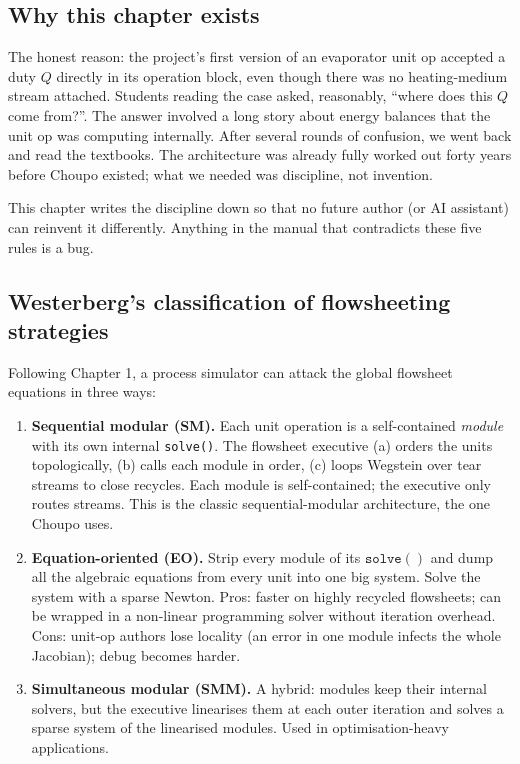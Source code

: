 \documentclass[11pt,a4paper]{article}
\begin{document}
\subsection{Why this chapter exists}

The honest reason: the project's first version of an evaporator unit
op accepted a duty $Q$ directly in its operation block, even though
there was no heating-medium stream attached.  Students reading the
case asked, reasonably, ``where does this $Q$ come from?''.  The
answer involved a long story about energy balances that the unit op
was computing internally.  After several rounds of confusion, we
went back and read the textbooks.  The architecture was already
fully worked out forty years before Choupo existed; what we needed
was discipline, not invention.

This chapter writes the discipline down so that no future author
(or AI assistant) can reinvent it differently.  Anything in the
manual that contradicts these five rules is a bug.

\subsection{Westerberg's classification of flowsheeting strategies}

Following \cite{Westerberg1979} Chapter 1, a process simulator can
attack the global flowsheet equations in three ways:

\begin{enumerate}[leftmargin=*,nosep,topsep=2pt]
  \item \textbf{Sequential modular (SM).}  Each unit operation is
        a self-contained \emph{module} with its own internal
        \texttt{solve()}.  The flowsheet executive (a) orders the
        units topologically, (b) calls each module in order,
        (c) loops Wegstein over tear streams to close recycles.
        Each module is self-contained; the executive only routes
        streams.  This is the classic sequential-modular architecture,
        the one Choupo uses.
  \item \textbf{Equation-oriented (EO).}  Strip every module
        of its $\mathtt{solve}()$ and dump all the algebraic
        equations from every unit into one big system.  Solve the
        system with a sparse Newton.  Pros: faster on highly
        recycled flowsheets; can be wrapped in a non-linear
        programming solver without iteration overhead.  Cons:
        unit-op authors lose locality (an error in one module
        infects the whole Jacobian); debug becomes harder.
  \item \textbf{Simultaneous modular (SMM).}  A hybrid: modules
        keep their internal solvers, but the executive linearises
        them at each outer iteration and solves a sparse system
        of the linearised modules.  Used in optimisation-heavy
        applications.
\end{enumerate}
\end{document}
